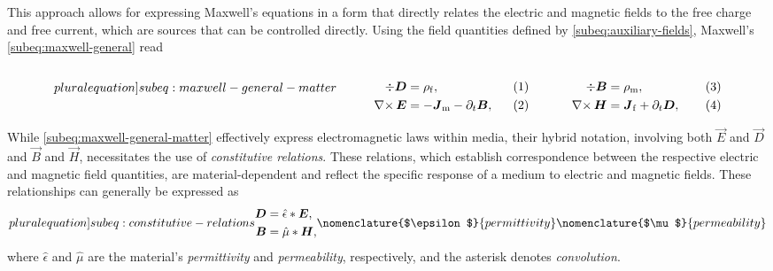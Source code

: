 \documentclass[11pt,a4paper,twoside,openany]{report}
\begin{document}
This approach allows for expressing Maxwell's equations in a form that directly relates the electric and magnetic fields to the free charge and free current, which are sources that can be controlled directly. Using the field quantities defined by \cref{subeq:auxiliary-fields}, Maxwell's \cref{subeq:maxwell-general} read\\
\begin{subequations}
    \label[pluralequation]{subeq:maxwell-general-matter}
    \noindent\centering
    \begin{minipage}{0.45\textwidth}
        \begin{align}
            \label{eq:maxwell-general-matter-div-d}
            \div\vec D &= \rho_{\mathrm f},
        \\
            \label{eq:maxwell-general-matter-curl-e}
            \curl\vec E &= -\vec J_{\mathrm m} - \partial_t\vec B,
        \end{align}
    \end{minipage}
    \hfill
    \begin{minipage}{0.45\textwidth}
        \begin{align}
            \label{eq:maxwell-general-matter-div-b}
            \div\vec B &= \rho_{\mathrm{m}},
        \\
            \label{eq:maxwell-general-matter-curl-h}
            \curl\vec H &= \vec J_{\mathrm f} + \partial_t\vec D,
        \end{align}
    \end{minipage}
    \bigskip
\end{subequations}

While \cref{subeq:maxwell-general-matter} effectively express electromagnetic laws within media, their hybrid notation, involving both $\vec E$ and $\vec D$ and $\vec B$ and $\vec H$, necessitates the use of \emph{constitutive relations}. These relations, which establish correspondence between the respective electric and magnetic field quantities, are material-dependent and reflect the specific response of a medium to electric and magnetic fields. These relationships can generally be expressed as
\begin{subequations}
    \label[pluralequation]{subeq:constitutive-relations}
    \begin{align}
        \label{eq:constitutive-relation-permittivity}
        \vec D &= \hat\epsilon \ast \vec E,
    \\
        \label{eq:constitutive-relation-permeability}
        \vec B &= \hat\mu \ast \vec H,
    \end{align}
    \nomenclature{$\epsilon$}{permittivity }%
    \nomenclature{$\mu$}{permeability }%
    \index{constitutive relations}
    \index{constitutive parameters}
\end{subequations}
where $\hat\epsilon$ and $\hat\mu$ are the material's \emph{permittivity} and \emph{permeability}, respectively, and the asterisk denotes \emph{convolution}.
\end{document}
